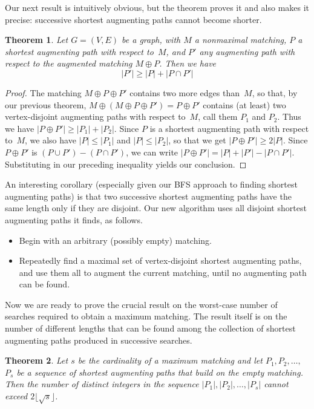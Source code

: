 \documentclass[11pt]{article}
\newtheorem{theorem}{Theorem}
\begin{document}
Our next result is intuitively obvious, but the theorem proves it and
also makes it precise: successive shortest augmenting paths cannot become
shorter.
\begin{theorem}
  Let $G=(V,E)$ be a graph, with $M$ a nonmaximal matching,
  $P$ a shortest augmenting path with respect to~$M$\negthinspace,
  and $P'$ any augmenting path with respect to the augmented
  matching $M \oplus P$\negthinspace.  Then we have
  $$|P'| \geq |P| + |P \cap P'|$$
\end{theorem}
\begin{proof}
  The matching $M \oplus P \oplus P'$ contains two more edges
  than~$M$, so that, by our previous theorem,
  $M \oplus (M \oplus P \oplus P') = P \oplus P'$ contains (at least)
  two vertex-disjoint augmenting paths with respect to~$M$,
  call them $P_1$ and $P_2$.  Thus we have $|P \oplus P'| \geq |P_1|+|P_2|$.
  Since $P$ is a shortest augmenting path with respect to~$M$\negthinspace,
  we also have $|P| \leq |P_1|$ and $|P| \leq |P_2|$, so that we get
  $|P \oplus P'| \geq 2|P|$.  Since $P \oplus P'$ is $(P \cup P')-(P \cap P')$,
  we can write $|P \oplus P'| = |P| + |P'| - |P \cap P'|$.  Substituting
  in our preceding inequality yields our conclusion.
\end{proof}
An interesting corollary (especially given our BFS approach to finding
shortest augmenting paths) is that two successive shortest augmenting paths
have the same length only if they are disjoint.  Our new algorithm
uses all disjoint shortest augmenting paths it finds, as follows.
\begin{itemize}
  \item
    Begin with an arbitrary (possibly empty) matching.
  \item
    Repeatedly find a maximal set of vertex-disjoint shortest augmenting paths,
    and use them all to augment the current matching,
    until no augmenting path can be found.
\end{itemize}
Now we are ready to prove the crucial result on the worst-case number of
searches required to obtain a maximum matching.  The result itself is on
the number of different lengths that can be found among the collection of
shortest augmenting paths produced in successive searches.
\begin{theorem}
  Let $s$ be the cardinality of a maximum matching and let
  $P_1, P_2, \ldots,$ $P_s$ be a sequence of shortest augmenting paths
  that build on the empty matching.
  Then the number of distinct integers in the sequence
  $|P_1|, |P_2|, \ldots, |P_s|$ cannot exceed $2\lfloor\sqrt{s}\rfloor$.
\end{theorem}
\end{document}
